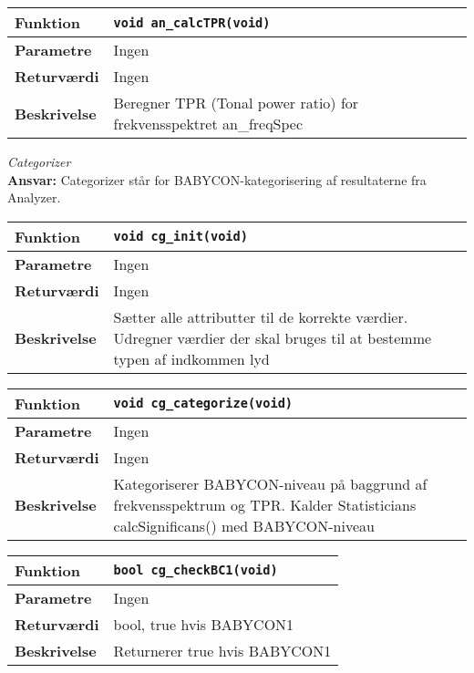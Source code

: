\begin{center}
    \begin{tabular}{ | l | p{} |}
    \hline
    \textbf{Funktion}	& \verb+void an_calcTPR(void) +						\\ \hline
    \textbf{Parametre} 	& Ingen		\\ \hline
    \textbf{Returværdi}	& Ingen							\\ \hline
    \textbf{Beskrivelse}& Beregner TPR (Tonal power ratio) for frekvensspektret an\_freqSpec  \\ \hline
    \end{tabular}
\end{center} 


\textit{Categorizer} \\
\textbf{Ansvar:} Categorizer står for BABYCON-kategorisering af resultaterne fra Analyzer.

\begin{center}
    \begin{tabular}{ | l | p{} |}
    \hline
    \textbf{Funktion}	& \verb+void cg_init(void)+ \\ \hline
    \textbf{Parametre} 	& Ingen\\ \hline
    \textbf{Returværdi}	& Ingen	 								\\ \hline
    \textbf{Beskrivelse}& Sætter alle attributter til de korrekte værdier. Udregner værdier der skal bruges til at bestemme typen af indkommen lyd	\\ \hline
    \end{tabular}
\end{center}

\begin{center}
    \begin{tabular}{ | l | p{} |}
    \hline
    \textbf{Funktion}	& \verb+void cg_categorize(void) +						\\ \hline
    \textbf{Parametre} 	& Ingen\\ \hline
    \textbf{Returværdi}	& Ingen	 								\\ \hline
    \textbf{Beskrivelse}& Kategoriserer BABYCON-niveau på baggrund af frekvensspektrum og TPR. Kalder Statisticians calcSignificans() med BABYCON-niveau		\\ \hline
    \end{tabular}
\end{center}

\begin{center}
    \begin{tabular}{ | l | p{} |}
    \hline
    \textbf{Funktion}	& \verb+bool cg_checkBC1(void) +						\\ \hline
    \textbf{Parametre} 	& Ingen 								\\ \hline
    \textbf{Returværdi}	& bool, true hvis BABYCON1 	 								\\ \hline
    \textbf{Beskrivelse}& Returnerer true hvis BABYCON1		\\ \hline
    \end{tabular}
\end{center}

